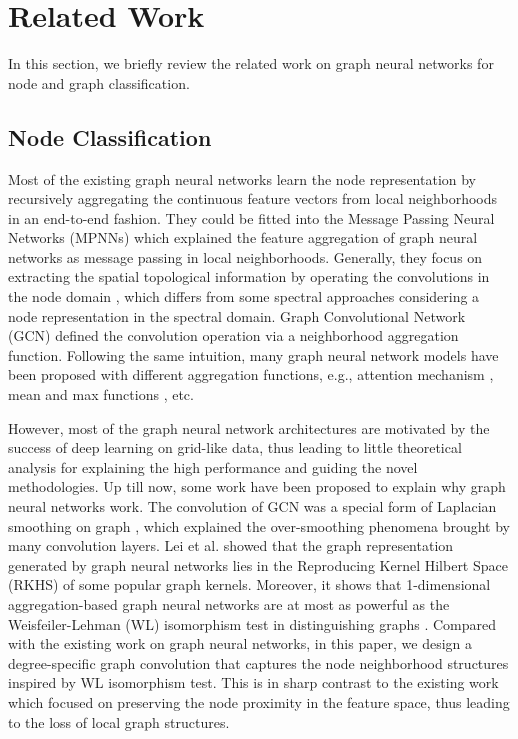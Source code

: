 \documentclass[sigconf]{acmart}
\begin{document}
\section{Related Work}
In this section, we briefly review the related work on graph neural networks for node and graph classification.

\subsection{Node Classification}
Most of the existing graph neural networks \cite{hamilton2017representation} learn the node representation by recursively aggregating the continuous feature vectors from local neighborhoods in an end-to-end fashion. They could be fitted into the Message Passing Neural Networks (MPNNs) \cite{gilmer2017neural} which explained the feature aggregation of graph neural networks as message passing in local neighborhoods.
Generally, they focus on extracting the spatial topological information by operating the convolutions in the node domain \cite{zhang2018graph}, which differs from some spectral approaches \cite{defferrard2016convolutional, kipf2016semi} considering a node representation in the spectral domain. Graph Convolutional Network (GCN) \cite{kipf2016semi} defined the convolution operation via a neighborhood aggregation function. Following the same intuition, many graph neural network models have been proposed with different aggregation functions, e.g., attention mechanism \cite{velickovic2017graph}, mean and max functions \cite{hamilton2017inductive}, etc.

However, most of the graph neural network architectures are motivated by the success of deep learning on grid-like data, thus leading to little theoretical analysis for explaining the high performance and guiding the novel methodologies. Up till now, some work have been proposed to explain why graph neural networks work. The convolution of GCN was a special form of Laplacian smoothing on graph \cite{li2018deeper}, which explained the over-smoothing phenomena brought by many convolution layers. Lei et al. \cite{lei2017deriving} showed that the graph representation generated by graph neural networks lies in the Reproducing Kernel Hilbert Space (RKHS) of some popular graph kernels. Moreover, it shows that 1-dimensional aggregation-based graph neural networks are at most as powerful as the Weisfeiler-Lehman (WL) isomorphism test \cite{weisfeiler1968reduction} in distinguishing graphs \cite{xu2018powerful}. Compared with the existing work on graph neural networks, in this paper, we design a degree-specific graph convolution that captures the node neighborhood structures inspired by WL isomorphism test. This is in sharp contrast to the existing work which focused on preserving the node proximity in the feature space, thus leading to the loss of local graph structures.
\end{document}

